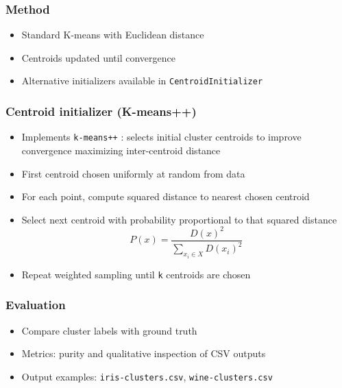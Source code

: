 \documentclass{beamer}
\begin{document}
\begin{frame}\frametitle{Method}
    \begin{itemize}
        \item Standard K-means with Euclidean distance
        \item Centroids updated until convergence
        \item Alternative initializers available in \texttt{CentroidInitializer}
    \end{itemize}
\end{frame}

\begin{frame}\frametitle{Centroid initializer (K-means++)}
    \begin{itemize}
        \item Implements \texttt{k-means++} : selects initial cluster centroids to improve convergence maximizing inter-centroid distance
        \item First centroid chosen uniformly at random from data
        \item For each point, compute squared distance to nearest chosen centroid
        \item Select next centroid with probability proportional to that squared distance
              \begin{equation}
                  P(x) = \frac{D(x)^2}{\sum_{x_i \in X} D(x_i)^2}
              \end{equation}
        \item Repeat weighted sampling until \texttt{k} centroids are chosen
    \end{itemize}
\end{frame}

\begin{frame}\frametitle{Evaluation}
    \begin{itemize}
        \item Compare cluster labels with ground truth
        \item Metrics: purity and qualitative inspection of CSV outputs
        \item Output examples: \texttt{iris-clusters.csv}, \texttt{wine-clusters.csv}
    \end{itemize}
\end{frame}
\end{document}

